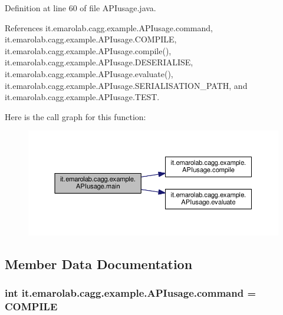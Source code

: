 Definition at line 60 of file A\-P\-Iusage.\-java.



References it.\-emarolab.\-cagg.\-example.\-A\-P\-Iusage.\-command, it.\-emarolab.\-cagg.\-example.\-A\-P\-Iusage.\-C\-O\-M\-P\-I\-L\-E, it.\-emarolab.\-cagg.\-example.\-A\-P\-Iusage.\-compile(), it.\-emarolab.\-cagg.\-example.\-A\-P\-Iusage.\-D\-E\-S\-E\-R\-I\-A\-L\-I\-S\-E, it.\-emarolab.\-cagg.\-example.\-A\-P\-Iusage.\-evaluate(), it.\-emarolab.\-cagg.\-example.\-A\-P\-Iusage.\-S\-E\-R\-I\-A\-L\-I\-S\-A\-T\-I\-O\-N\-\_\-\-P\-A\-T\-H, and it.\-emarolab.\-cagg.\-example.\-A\-P\-Iusage.\-T\-E\-S\-T.



Here is the call graph for this function\-:\nopagebreak
\begin{figure}[H]
\begin{center}
\leavevmode
\includegraphics[width=350pt]{classit_1_1emarolab_1_1cagg_1_1example_1_1APIusage_af31180520f3ca52e6319f2f0d2525eeb_cgraph}
\end{center}
\end{figure}




\subsection{Member Data Documentation}
\hypertarget{classit_1_1emarolab_1_1cagg_1_1example_1_1APIusage_abae8cc4ce00dc484e44a0cc67f367485}{
\subsubsection[{command}]{\setlength{\rightskip}{0pt plus 5cm}int it.\-emarolab.\-cagg.\-example.\-A\-P\-Iusage.\-command = {\bf C\-O\-M\-P\-I\-L\-E}\hspace{0.3cm}{\ttfamily [static]}}}\label{classit_1_1emarolab_1_1cagg_1_1example_1_1APIusage_abae8cc4ce00dc484e44a0cc67f367485}


